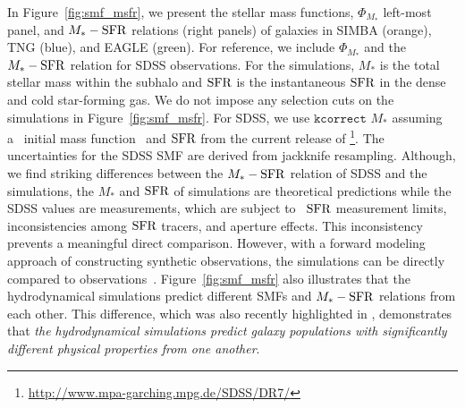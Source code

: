 In Figure~\ref{fig:smf_msfr}, we present the stellar mass functions,
$\Phi_{M_*}$ left-most panel, and $M_*-{\rm SFR}$ relations (right panels) of
galaxies in SIMBA (orange), TNG (blue), and EAGLE (green). For reference, we
include $\Phi_{M_*}$ and the 
$M_*-{\rm SFR}$ relation for SDSS observations. For the simulations, $M_*$ is the
total stellar mass within the subhalo and ${\rm SFR}$ is the instantaneous ${\rm SFR}$ in the
dense and cold star-forming gas. 
We do not impose any selection cuts on the simulations in Figure~\ref{fig:smf_msfr}. 
For SDSS, we use $\mathtt{kcorrect}$ $M_*$ assuming a~\cite{chabrier2003}
initial mass function~\citep{blanton2007a} and ${\rm SFR}$ from the
current release of \cite{brinchmann2004}\footnote{\url{http://www.mpa-garching.mpg.de/SDSS/DR7/}}.
The uncertainties for the SDSS SMF are derived from jackknife resampling.
Although, we find striking differences between the $M_*-{\rm SFR}$ relation of SDSS
and the simulations, the $M_*$ and ${\rm SFR}$ of simulations are theoretical
predictions while the SDSS values are measurements, which are subject to
\eg~${\rm SFR}$ measurement limits, inconsistencies among ${\rm SFR}$ tracers, and
aperture effects.
This inconsistency prevents a meaningful direct comparison. 
However, with a forward modeling approach of constructing synthetic
observations, the simulations can be directly compared to
observations~\citep[see \eg][Starkenburg et al. in prep.]{dickey2020}.
Figure~\ref{fig:smf_msfr} also illustrates that the hydrodynamical simulations
predict different SMFs and $M_*-{\rm SFR}$ relations from each other.
This difference, which was also recently highlighted in \cite{hahn2019c},
demonstrates that \emph{the hydrodynamical simulations predict galaxy
populations with significantly different physical properties from one
another}.

